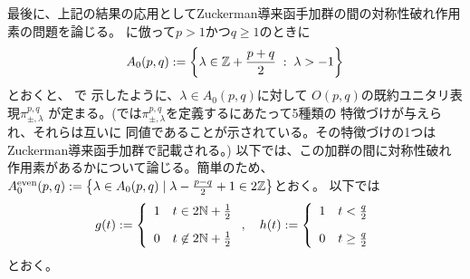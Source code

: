 \documentclass[12pt]{article} %
\newcommand{\nin}{\not\in}
\theoremstyle{definition}
\theoremstyle{exampstyle} \newtheorem{examp}[theorem]{Theorem}
\newcommand{\doubt}[1]{{#1}}
\begin{document}
	最後に、上記の結果の応用としてZuckerman導来函手加群の間の対称性破れ作用素の問題を論じる。
\cite[(5.1.1)]{KO2}に\doubt{倣}って$p>1${かつ}$q\ge1$のときに\begin{equation*}
	A_0(p,q):=\left\{ \lambda\in\mathbb{Z}+\frac{p+q}{2}\;:\;\lambda>-1 \right\}
\end{equation*}とおくと、
\cite{KO2}で
示したように、$\lambda\in A_0(p,q)$に対して
$O(p,q)$の既約ユニタリ表現$\pi_{\pm,\lambda}^{p,q}$
が定まる。(\cite{KO2}では$\pi_{\pm,\lambda}^{p,q}$を定義するにあたって5種類の
特徴づけが与えら{れ}、それらは互いに
同値であることが示されている。その特徴づけの1つは
Zuckerman導来函手加群で記載される。)
以下では、この加群の間に対称性破れ作用素がある{か}について論じる。簡単のため、$A_0^{\mbox{\scriptsize even}}(p,q):=\left\{ \lambda\in A_0(p,q)\mid \lambda-\frac{p-q}{2}+1\in2\mathbb{Z} \right\}$とおく。
以下では\begin{equation*}
	g(t):=\left\{ \begin{array}[]{ll}
		1&t\in2\N+\frac{1}{2}\\[10pt]
		0&t\nin 2\N+\frac{1}{2}
	\end{array}\right.,\quad h(t):=\left\{ \begin{array}[]{ll}
		1&t<\frac{q}{2}\\[10pt]
		0&t\ge\frac{q}{2}
\end{array}\right.
\end{equation*}とおく。
\end{document}
